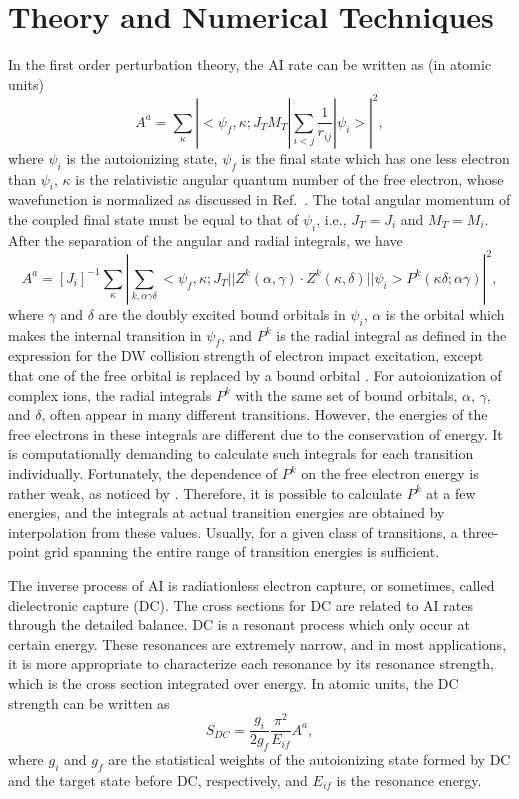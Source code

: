 \documentclass[preprint, floatfix, pra, showpacs, showkeys]{revtex4}
\begin{document}
\section{Theory and Numerical Techniques}
\label{sec_theory}
In the first order perturbation theory, the AI rate can be written as (in
atomic units) 
\begin{equation}
A^a = \sum_\kappa \left|
<\psi_f,\kappa;J_TM_T|\sum_{i<j}\frac{1}{r_{ij}}|\psi_i>\right|^2,
\end{equation}
where $\psi_i$ is the autoionizing state, $\psi_f$ is the final state which has
one less electron than $\psi_i$, $\kappa$ is the relativistic angular quantum
number of the free electron, whose wavefunction is normalized as discussed in
Ref.~\cite{gu02b}. The total angular momentum of the coupled final state must
be equal to that of $\psi_i$, i.e.,  $J_T = J_i$ and $M_T = M_i$. After the
separation of the angular and radial integrals, we have
\begin{equation}
A^a = [J_i]^{-1}\sum_\kappa \left|\sum_{k,\alpha\gamma\delta}
<\psi_f,\kappa;J_T||Z^k(\alpha,\gamma)
\cdot Z^k(\kappa,\delta)||\psi_i>P^k(\kappa\delta;\alpha\gamma)\right|^2,
\end{equation}
where $\gamma$ and $\delta$ are the doubly excited bound orbitals in
$\psi_i$, $\alpha$ is the orbital which makes the internal transition in
$\psi_f$, and
$P^k$ is the radial integral as defined in the expression for the DW collision
strength of electron impact excitation, except that one of the free orbital
is replaced by a bound orbital \cite{gu02b}. For autoionization of
complex ions, the radial integrals $P^k$ with the same set of bound orbitals,
$\alpha$, $\gamma$, and $\delta$, 
often appear in many different transitions. However, the energies of the free
electrons in these integrals are different due to the conservation of
energy. It is 
computationally demanding to calculate such integrals for each transition
individually. Fortunately, the dependence of $P^k$ on the free electron energy
is rather weak, as noticed by \textcite{oreg91}. Therefore, it is possible to
calculate $P^k$ at a few energies, and the integrals at actual transition
energies are obtained by interpolation from these values. Usually, for a given
class of 
transitions, a three-point grid spanning the entire range of transition
energies is sufficient.

The inverse process of AI is radiationless electron capture, or sometimes,
called dielectronic capture (DC). The cross sections for DC are related to AI
rates through the detailed balance. DC is a resonant process which only occur
at certain energy. These resonances are extremely narrow, and in most
applications, it is more appropriate to characterize each resonance by its
resonance strength, which is the cross section integrated over energy. In
atomic units, the DC strength can be written as
\begin{equation}
S_{DC} = \frac{g_i}{2g_f}\frac{\pi^2}{E_{if}}A^a,
\end{equation}
where $g_i$ and $g_f$ are the statistical weights of the autoionizing state
formed by DC and the target state before DC, respectively, and $E_{if}$ is the
resonance energy. 
\end{document}
